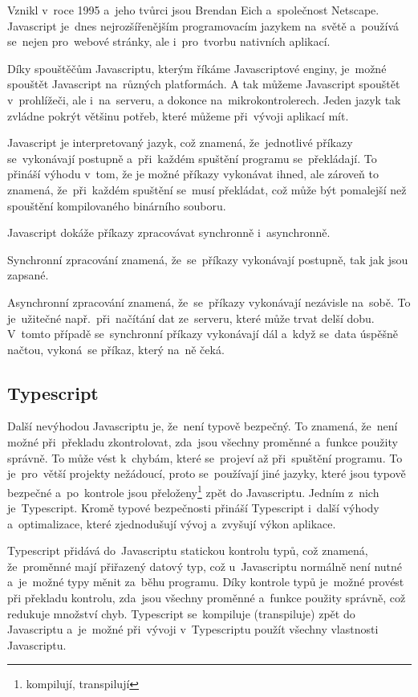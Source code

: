 \documentclass[14pt,a4paper]{article}
\begin{document}
        Vznikl v~roce 1995 a~jeho tvůrci jsou Brendan Eich a~společnost Netscape.
        Javascript je~dnes nejrozšířenějším programovacím jazykem na~světě a~používá se~nejen pro~webové stránky,
        ale i~pro~tvorbu nativních aplikací.

        Díky spouštěčům Javascriptu, kterým říkáme Javascriptové enginy, je~možné spouštět Javascript na~různých platformách.
        A tak můžeme Javascript spouštět v~prohlížeči, ale i~na~serveru, a dokonce na~mikrokontrolerech. Jeden jazyk tak zvládne pokrýt
        většinu potřeb, které můžeme při~vývoji aplikací mít.

        Javascript je interpretovaný jazyk, což znamená, že~jednotlivé příkazy se~vykonávají postupně a~při~každém spuštění programu se~překládají.
        To přináší výhodu v~tom, že je možné příkazy vykonávat ihned, ale zároveň to znamená, že~při~každém spuštění se~musí překládat, což může být pomalejší než spouštění kompilovaného binárního souboru.

        Javascript dokáže příkazy zpracovávat synchronně i~asynchronně.
        
        Synchronní zpracování znamená, že~se~příkazy vykonávají postupně, tak jak
        jsou zapsané.
        
        Asynchronní zpracování znamená, že~se~příkazy vykonávají nezávisle na~sobě. To je~užitečné např.~při~načítání dat ze~serveru,
        které může trvat delší dobu. V~tomto případě se~synchronní příkazy vykonávají dál a~když se~data úspěšně načtou, vykoná~se příkaz, který na~ně čeká. \parencite{kantor_javascript}

        \subsection{Typescript}
        Další nevýhodou Javascriptu je, že~není typově bezpečný. To znamená, že~není možné při~překladu zkontrolovat, zda~jsou všechny proměnné
        a~funkce použity správně. To může vést k~chybám, které se~projeví až při~spuštění programu. To je~pro~větší projekty nežádoucí, proto se~používají
        jiné jazyky, které jsou typově bezpečné a~po~kontrole jsou přeloženy\footnote{kompilují, transpilují} zpět do Javascriptu. Jedním z~nich je~Typescript.
        Kromě typové bezpečnosti přináší Typescript i~další výhody a~optimalizace, které zjednodušují vývoj a~zvyšují výkon aplikace.

        Typescript přidává do~Javascriptu statickou kontrolu typů, což znamená, že~proměnné mají přiřazený datový typ, což
        u~Javascriptu normálně není nutné a~je~možné typy měnit za~běhu programu.
        Díky kontrole typů je~možné provést při překladu kontrolu, zda~jsou všechny proměnné a~funkce použity správně, což redukuje množství chyb.
        Typescript se~kompiluje (transpiluje) zpět do Javascriptu a~je~možné při~vývoji v~Typescriptu použít všechny vlastnosti Javascriptu.\parencite[Get started/TypeScript for the New Programmer]{TypeScript}
\end{document}
